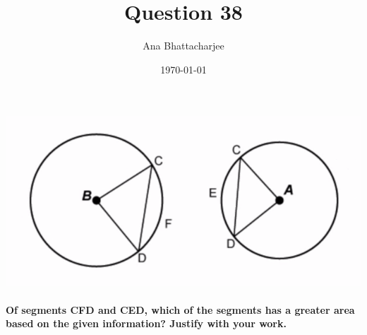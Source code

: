 \documentclass{article}
\begin{document}
\title{Question 38}
\author{Ana Bhattacharjee}
\date{\today}
\maketitle{}


\includegraphics[width=0.9\columnwidth]{q38.png}
\paragraph{Of segments CFD and CED, which of the segments has a greater area based on the given information? Justify with your work.}
\end{document}
